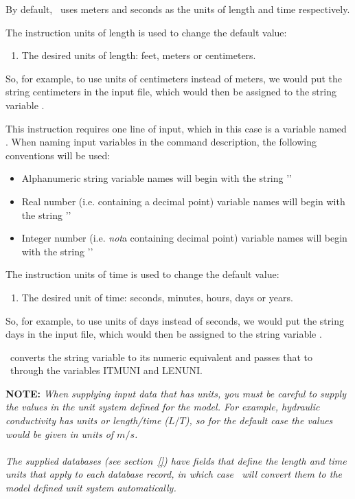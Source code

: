 \label{section:Units}
By default, \mut\ uses meters and seconds as the units of length and time respectively.

The instruction \textsf{units of length} is used to change the default value:

    {
        \squish
        \begin{enumerate}
        \item {}  The desired units of length: feet, meters or centimeters.
        \end{enumerate}

        So, for example, to use units of centimeters instead of meters, we would put the string \textsf{centimeters} in the input file, which would then be assigned to the string variable . }

This instruction requires one line of input, which in this case is a variable named .  When naming input variables in the command description, the following conventions will be used:
\begin{itemize}
    \item Alphanumeric string variable names will begin with
    the string '\str{}'
    \item Real number (i.e. containing a decimal point) variable names will begin with
    the string '\rnum{}'
    \item Integer number (i.e. {\em not}a  containing decimal point) variable names will begin with
    the string '\inum{}'
\end{itemize}

The instruction \textsf{units of time} is used to change the default value:

    {
        \squish
        \begin{enumerate}
        \item {}  The desired unit of time: seconds, minutes, hours, days or years.
        \end{enumerate}

        So, for example, to use units of days instead of seconds, we would put the string \textsf{days} in the input file, which would then be assigned to the string variable .
    }

\mut\ converts the string variable  to its numeric equivalent and passes that to \mfus\ through the variables \textsf{ITMUNI} and \textsf{LENUNI}.

{\bf NOTE:} {\em When supplying input data that has units, you must be careful to supply the values in the unit system defined for the model. For example, hydraulic conductivity has units or length/time ($L/T$), so for the default case the values would be given in units of $m/s$. \\ \\
 The supplied databases (see section~\ref{}) have fields that define the length and time units that apply to each database record, in which case \mut\ will convert them to the model defined unit system automatically.}

